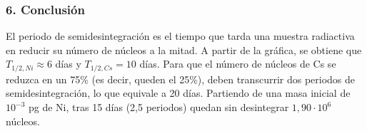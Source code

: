 \subsubsection*{6. Conclusión}
\begin{cajaconclusion}
El periodo de semidesintegración es el tiempo que tarda una muestra radiactiva en reducir su número de núcleos a la mitad. A partir de la gráfica, se obtiene que $T_{1/2, Ni} \approx 6$ días y $T_{1/2, Cs} = 10$ días. Para que el número de núcleos de Cs se reduzca en un 75\% (es decir, queden el 25\%), deben transcurrir dos periodos de semidesintegración, lo que equivale a 20 días. Partiendo de una masa inicial de $10^{-3}$ pg de Ni, tras 15 días (2,5 periodos) quedan sin desintegrar $1,90 \cdot 10^6$ núcleos.
\end{cajaconclusion}

\newpage